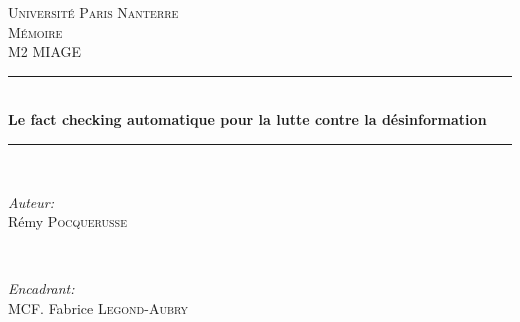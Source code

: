 \documentclass[12pt]{article}
\begin{document}
\begin{titlepage}


\newcommand{\HRule}{\rule{\linewidth}{0.5mm}} %

\center %
 

\textsc{\LARGE Université Paris Nanterre}\\[1.5cm] %
\textsc{\Large Mémoire}\\[0.5cm] %
\textsc{\large M2 MIAGE}\\[0.5cm] %


\HRule \\[0.4cm]
{ \huge \bfseries Le fact checking automatique pour la lutte contre la désinformation}\\[0.4cm] %
\HRule \\[1.5cm]
 

\begin{minipage}{0.4\textwidth}
\begin{flushleft} \large
\emph{Auteur:}\\
Rémy \textsc{Pocquerusse} %
\end{flushleft}
\end{minipage}
~
\begin{minipage}{0.4\textwidth}
\begin{flushright} \large
\emph{Encadrant:} \\
MCF. Fabrice \textsc{Legond-Aubry} %
\end{flushright}
\end{minipage}\\[2cm]


\end{titlepage}
\end{document}

